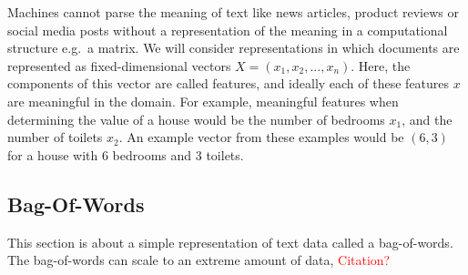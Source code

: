 Machines cannot parse the meaning of text like news articles, product reviews or social media posts  without a representation of the meaning in a computational structure e.g.\ a matrix.  We will consider representations in which documents are represented as fixed-dimensional vectors  $X = (x_1, x_2, ..., x_n)$. Here, the components of this vector are called features, and ideally each of these features $x$ are meaningful in the domain. For example, meaningful features when determining the  value of a house would be the number of bedrooms $x_1$, and the number of toilets $x_2$. An example vector from these examples would be $(6,3)$ for a house with 6 bedrooms and 3 toilets.  %










\subsection{Bag-Of-Words}\label{bg:BOW}
This section is about a simple representation of text data called a bag-of-words. The bag-of-words can scale to an extreme amount of data,  \textcolor{red}
{Citation?}

